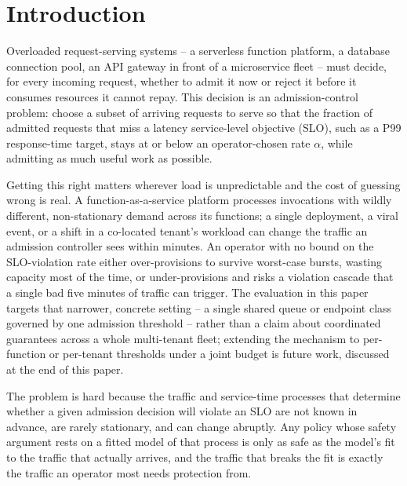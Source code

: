 \documentclass[11pt,letterpaper]{article}
\begin{document}
\section{Introduction}

Overloaded request-serving systems -- a serverless function platform, a database connection pool, an API gateway in front of a microservice fleet -- must decide, for every incoming request, whether to admit it now or reject it before it consumes resources it cannot repay. This decision is an admission-control problem: choose a subset of arriving requests to serve so that the fraction of admitted requests that miss a latency service-level objective (SLO), such as a P99 response-time target, stays at or below an operator-chosen rate $\alpha$, while admitting as much useful work as possible.

Getting this right matters wherever load is unpredictable and the cost of guessing wrong is real. A function-as-a-service platform processes invocations with wildly different, non-stationary demand across its functions; a single deployment, a viral event, or a shift in a co-located tenant's workload can change the traffic an admission controller sees within minutes. An operator with no bound on the SLO-violation rate either over-provisions to survive worst-case bursts, wasting capacity most of the time, or under-provisions and risks a violation cascade that a single bad five minutes of traffic can trigger. The evaluation in this paper targets that narrower, concrete setting -- a single shared queue or endpoint class governed by one admission threshold -- rather than a claim about coordinated guarantees across a whole multi-tenant fleet; extending the mechanism to per-function or per-tenant thresholds under a joint budget is future work, discussed at the end of this paper.

The problem is hard because the traffic and service-time processes that determine whether a given admission decision will violate an SLO are not known in advance, are rarely stationary, and can change abruptly. Any policy whose safety argument rests on a fitted model of that process is only as safe as the model's fit to the traffic that actually arrives, and the traffic that breaks the fit is exactly the traffic an operator most needs protection from.
\end{document}
